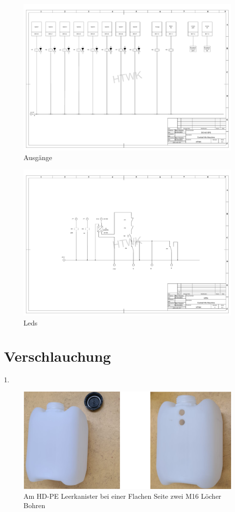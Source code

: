 \documentclass[10pt,a4paper]{report}
\begin{document}
	\begin{figure}[htb]
		\includegraphics[width=1\textwidth]{DO AO SPS (V2).pdf}
		\centering
		\caption{Ausgänge}
	\end{figure}
	\begin{figure}[htb]
		\includegraphics[width=1\textwidth]{LEDs (V2).pdf}
		\centering
		\caption{Leds}
	\end{figure}
	
	

	\chapter{Verschlauchung}
	1.
	
	\begin{figure}[htb]
		\includegraphics[width=1\textwidth]{zu 1.}
		\centering
		\caption{Am HD-PE Leerkanister bei einer Flachen Seite zwei M16 Löcher Bohren}
	\end{figure}
	
\end{document}
